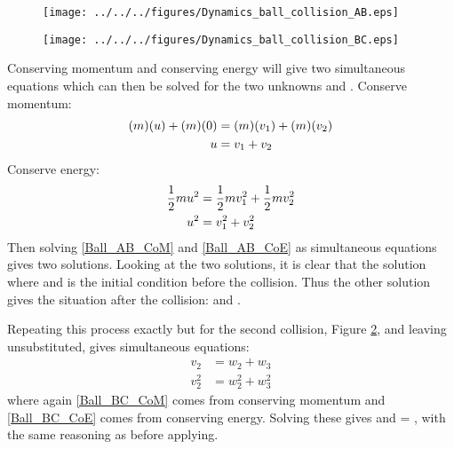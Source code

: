 \begin{problem}[A1969AMIIQ8l]
{{\begin{figure}[h]
  \centering
 	\texttt{[image: ../../../figures/Dynamics\_ball\_collision\_AB.eps]}
	\caption{}
	\label{fig:Dynamics_ball_collision_AB}
\end{figure}
\begin{figure}[h]
	\centering
	\texttt{[image: ../../../figures/Dynamics\_ball\_collision\_BC.eps]}
	\caption{}
	\label{fig:Dynamics_ball_collision_BC}
\caption{}
\end{figure}

Conserving momentum and conserving energy will give two simultaneous equations which can then be solved for the two unknowns  and .
Conserve momentum:
\begin{eqnarray} \notag 
(m)(u) + (m)(0) &= (m)(v_{1}) + (m)(v_{2}) \\ u &= v_{1} + v_{2} \label{Ball_AB_CoM}
\end{eqnarray}
Conserve energy:
\begin{eqnarray} \notag 
\frac{1}{2}mu^{2} &= \frac{1}{2}mv_{1}^{2} + \frac{1}{2}mv_{2}^{2} \\ u^{2} &= v_{1}^{2} + v_{2}^{2} \label{Ball_AB_CoE}
\end{eqnarray}
Then solving \ref{Ball_AB_CoM} and \ref{Ball_AB_CoE} as simultaneous equations gives two solutions. Looking at the two solutions, it is clear that the solution where  and  is the initial condition before the collision. Thus the other solution gives the situation after the collision:  and .

Repeating this process exactly but for the second collision, Figure \ref{fig:Dynamics_ball_collision_BC}, and leaving  unsubstituted, gives simultaneous equations:
\begin{eqnarray} 
v_{2} &= w_{2} + w_{3} \label{Ball_BC_CoM} \\  
v_{2}^{2} &= w_{2}^{2} + w_{3}^{2} \label{Ball_BC_CoE}
\end{eqnarray}
where again \ref{Ball_BC_CoM} comes from conserving momentum and \ref{Ball_BC_CoE} comes from conserving energy. Solving these gives  and  = , with the same reasoning as before applying.

}}
\end{problem}
